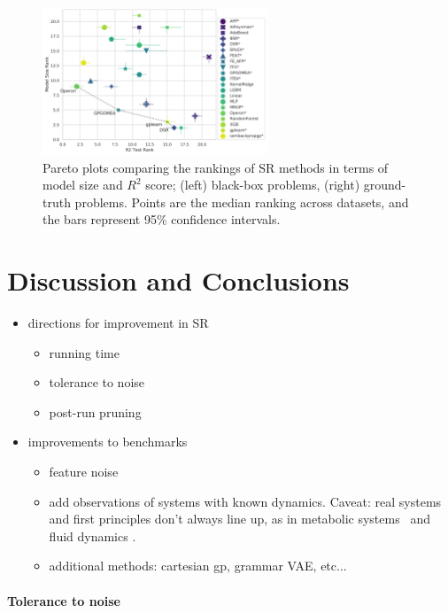 \begin{figure}
    \centering
    \includegraphics[width=0.6\textwidth]{figs/results_pmlb_r1/pareto_plot_r2_test_rank_model_size_rank.pdf}
    \caption{
        Pareto plots comparing the rankings of SR methods in terms of model size and $R^2$ score; (left) black-box problems, (right) ground-truth problems.
        Points are the median ranking across datasets, and the bars represent 95\% confidence intervals. 
    } \label{fig:pareto}
\end{figure}

\section{Discussion and Conclusions}
\begin{itemize}
    \item directions for improvement in SR
    \begin{itemize}
        \item running time
        \item tolerance to noise
        \item post-run pruning
    \end{itemize}
    \item improvements to benchmarks
    \begin{itemize}
        \item feature noise
        \item add observations of systems with known dynamics. Caveat: real systems and first principles don't always line up, as in metabolic systems~\cite{yeast} and fluid dynamics \cite{lacavaInferenceCompactNonlinear2016}. 
        \item additional methods: cartesian gp, grammar VAE, etc...
    \end{itemize}
\end{itemize}

\paragraph{Tolerance to noise}
